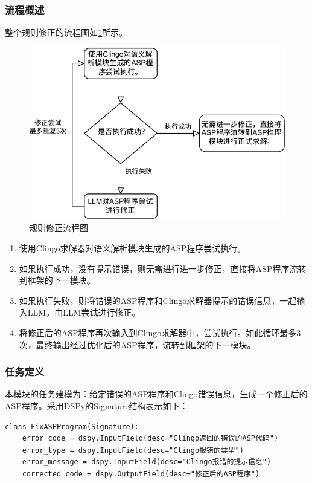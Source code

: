 \subsubsection{流程概述}
整个规则修正的流程图如\ref{figure:rule-fix}所示。
\begin{figure}[h]
\centering
\includegraphics{figures/rule-fix-crop.pdf}
\caption{规则修正流程图}
\label{figure:rule-fix}
\end{figure}
\begin{enumerate}[nosep]
\item 使用Clingo求解器对语义解析模块生成的ASP程序尝试执行。
\item 如果执行成功，没有提示错误，则无需进行进一步修正，直接将ASP程序流转到框架的下一模块。
\item 如果执行失败，则将错误的ASP程序和Clingo求解器提示的错误信息，一起输入LLM，由LLM尝试进行修正。
\item 将修正后的ASP程序再次输入到Clingo求解器中，尝试执行。如此循环最多3次，最终输出经过优化后的ASP程序，流转到框架的下一模块。
\end{enumerate}
\subsubsection{任务定义}
本模块的任务建模为：给定错误的ASP程序和Clingo错误信息，生成一个修正后的ASP程序。采用DSPy的Signature结构表示如下：
\begin{lstlisting}
class FixASPProgram(Signature):
    error_code = dspy.InputField(desc="Clingo返回的错误的ASP代码")
    error_type = dspy.InputField(desc="Clingo报错的类型")
    error_message = dspy.InputField(desc="Clingo报错的提示信息")
    corrected_code = dspy.OutputField(desc="修正后的ASP程序")
\end{lstlisting}
